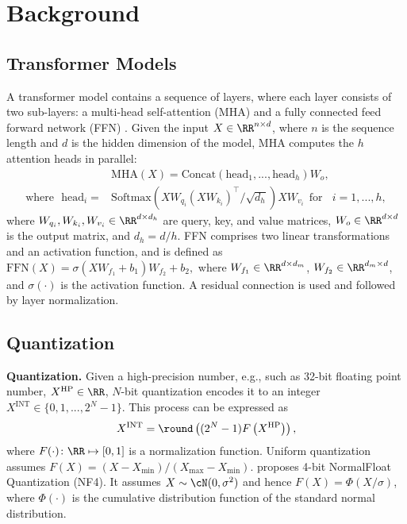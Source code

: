 \section{Background}
\subsection{Transformer Models}
A transformer model contains a sequence of layers, where each layer consists of two sub-layers: a multi-head self-attention (MHA) and a fully connected feed forward network (FFN) \citep{vaswani2017attention}. 
Given the input $X \in \RR^{n\times d}$, where $n$ is the sequence length and $d$ is the hidden dimension of the model, MHA computes the $h$ attention heads in parallel: 
\begin{align*}
    & \mathrm{MHA}(X) = \mathrm{Concat}(\mathrm{head}_1, ..., \mathrm{head}_h) W_o,\\
    \text{where}~~~ \mathrm{head}_i = &\mathrm{Softmax}({XW_{q_i} (XW_{k_i})^\top}/{\sqrt{d_h}}) XW_{v_i} ~~\text{for}~~~~i = 1, ..., h,
\end{align*}
where $W_{q_i}, W_{k_i}, W_{v_i} \in \RR^{d \times d_h}$ are query, key, and value matrices, $W_o \in \RR^{d\times d}$ is the output matrix, and $d_h = d/h$. FFN comprises two linear transformations and an activation function, and is defined as $ \mathrm{FFN}(X) = \sigma(X W_{f_1} + b_1) W_{f_2} + b_2, $
where $W_{f_1} \in \RR^{d \times d_m} $, $ W_{f_2} \in \RR^{d_m \times d}$, and $\sigma(\cdot)$ is the activation function. A residual connection is used and followed by layer normalization.     

\subsection{Quantization}
{\bf Quantization.} Given a high-precision number, e.g., such as 32-bit floating point number, $X^{\text{HP}} \in \RR$, $N$-bit quantization encodes it to an integer $X^{\text{INT}} \in \{0, 1, ..., 2^{N}-1\}$. This process can be expressed as
\begin{align}
\label{eq:quant}
    X^{\text{INT}} = \round\left((2^{N} - 1) F\left( X^{\text{HP}} \right) \right),
\end{align}
where $F(\cdot) \colon \RR \mapsto [0, 1]$ is a normalization function. Uniform quantization assumes $F(X) = (X - X_{\min}) /  (X_{\max} - X_{\min})$. \citet{dettmers2023qlora} proposes 4-bit NormalFloat Quantization (NF4). It assumes $X \sim \cN(0, \sigma^2)$ and hence $F(X) = \Phi(X/\sigma)$, where $\Phi(\cdot)$ is the cumulative distribution function of the standard normal distribution. 

